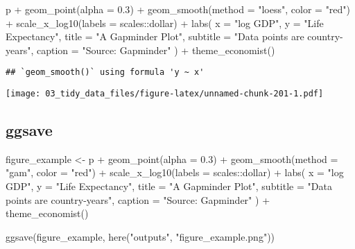 \documentclass[
]{book}
\newenvironment{Shaded}{\begin{snugshade}}{\end{snugshade}}
\newcommand{\AttributeTok}[1]{\textcolor[rgb]{0.77,0.63,0.00}{#1}}
\newcommand{\FloatTok}[1]{\textcolor[rgb]{0.00,0.00,0.81}{#1}}
\newcommand{\FunctionTok}[1]{\textcolor[rgb]{0.00,0.00,0.00}{#1}}
\newcommand{\NormalTok}[1]{#1}
\newcommand{\OtherTok}[1]{\textcolor[rgb]{0.56,0.35,0.01}{#1}}
\newcommand{\SpecialCharTok}[1]{\textcolor[rgb]{0.00,0.00,0.00}{#1}}
\newcommand{\StringTok}[1]{\textcolor[rgb]{0.31,0.60,0.02}{#1}}
\begin{document}
\begin{Shaded}
\begin{Highlighting}[]
\NormalTok{p }\SpecialCharTok{+} \FunctionTok{geom\_point}\NormalTok{(}\AttributeTok{alpha =} \FloatTok{0.3}\NormalTok{) }\SpecialCharTok{+}
  \FunctionTok{geom\_smooth}\NormalTok{(}\AttributeTok{method =} \StringTok{"loess"}\NormalTok{, }\AttributeTok{color =} \StringTok{"red"}\NormalTok{) }\SpecialCharTok{+}
  \FunctionTok{scale\_x\_log10}\NormalTok{(}\AttributeTok{labels =}\NormalTok{ scales}\SpecialCharTok{::}\NormalTok{dollar) }\SpecialCharTok{+}
  \FunctionTok{labs}\NormalTok{(}
    \AttributeTok{x =} \StringTok{"log GDP"}\NormalTok{,}
    \AttributeTok{y =} \StringTok{"Life Expectancy"}\NormalTok{,}
    \AttributeTok{title =} \StringTok{"A Gapminder Plot"}\NormalTok{,}
    \AttributeTok{subtitle =} \StringTok{"Data points are country{-}years"}\NormalTok{,}
    \AttributeTok{caption =} \StringTok{"Source: Gapminder"}
\NormalTok{  ) }\SpecialCharTok{+}
  \FunctionTok{theme\_economist}\NormalTok{()}
\end{Highlighting}
\end{Shaded}

\begin{verbatim}
## `geom_smooth()` using formula 'y ~ x'
\end{verbatim}

\texttt{[image: 03\_tidy\_data\_files/figure-latex/unnamed-chunk-201-1.pdf]}

\hypertarget{ggsave}{%
\subsection{ggsave}\label{ggsave}}

\begin{Shaded}
\begin{Highlighting}[]
\NormalTok{figure\_example }\OtherTok{\textless{}{-}}\NormalTok{ p }\SpecialCharTok{+} \FunctionTok{geom\_point}\NormalTok{(}\AttributeTok{alpha =} \FloatTok{0.3}\NormalTok{) }\SpecialCharTok{+}
  \FunctionTok{geom\_smooth}\NormalTok{(}\AttributeTok{method =} \StringTok{"gam"}\NormalTok{, }\AttributeTok{color =} \StringTok{"red"}\NormalTok{) }\SpecialCharTok{+}
  \FunctionTok{scale\_x\_log10}\NormalTok{(}\AttributeTok{labels =}\NormalTok{ scales}\SpecialCharTok{::}\NormalTok{dollar) }\SpecialCharTok{+}
  \FunctionTok{labs}\NormalTok{(}
    \AttributeTok{x =} \StringTok{"log GDP"}\NormalTok{,}
    \AttributeTok{y =} \StringTok{"Life Expectancy"}\NormalTok{,}
    \AttributeTok{title =} \StringTok{"A Gapminder Plot"}\NormalTok{,}
    \AttributeTok{subtitle =} \StringTok{"Data points are country{-}years"}\NormalTok{,}
    \AttributeTok{caption =} \StringTok{"Source: Gapminder"}
\NormalTok{  ) }\SpecialCharTok{+}
  \FunctionTok{theme\_economist}\NormalTok{()}

\FunctionTok{ggsave}\NormalTok{(figure\_example, }\FunctionTok{here}\NormalTok{(}\StringTok{"outputs"}\NormalTok{, }\StringTok{"figure\_example.png"}\NormalTok{))}
\end{Highlighting}
\end{Shaded}
\end{document}
